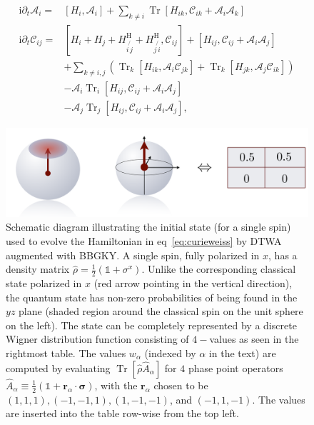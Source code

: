 \documentclass[extendedabs]{bmvc2k}
\newcommand\ii{{\mathrm{i}}}
\DeclareMathOperator{\Tr}{{Tr}}
\newcommand{\Com}[2]{\left[{#1},{#2}\right]}
\begin{document}
\begin{subequations}
\begin{align}
\ii\partial_t \mathscr{A}_i=&\Com{H_i}{\mathscr{A}_i}+\sum_{k\neq i}\Tr\Com{H_{ik}}{\mathscr{C}_{ik}+\mathscr{A}_i \mathscr{A}_k}\label{e:1st_order}\\
\ii\partial_t \mathscr{C}_{ij}=&\Com{H_i+H_j+H_{i\not{\,j}}^\text{H}+H_{j\not{\,i}}^\text{H}}{\mathscr{C}_{ij}}+\Com{H_{ij}}{\mathscr{C}_{ij}+\mathscr{A}_i \mathscr{A}_j}\nonumber\\
&+\sum_{k\neq i,j}\left(\Tr_k\Com{H_{ik}}{\mathscr{A}_i \mathscr{C}_{jk}}+\Tr_k\Com{H_{jk}}{\mathscr{A}_j \mathscr{C}_{ik}}\right)\nonumber\\
&-\mathscr{A}_i\Tr_i\Com{H_{ij}}{\mathscr{C}_{ij}+\mathscr{A}_i \mathscr{A}_j}\nonumber\\
&-\mathscr{A}_j\Tr_j\Com{H_{ij}}{\mathscr{C}_{ij}+\mathscr{A}_i \mathscr{A}_j},\label{e:2nd_order}
\end{align}
\end{subequations}
\begin{figure}[bht!]\centering
\includegraphics[width=\linewidth]{./images/fig1.jpg}
\caption{\label{f:wigner:init}Schematic diagram illustrating the initial state (for a single spin) used to evolve the Hamiltonian in eq~\ref{eq:curieweiss} by DTWA augmented with BBGKY. A single spin, fully polarized in $x$, has a density matrix $\hat{\rho} = \frac{1}{2}(\mathbb{1}+\sigma^x)$. Unlike the corresponding classical state polarized in $x$ (red arrow pointing in the vertical direction), the quantum state has non-zero probabilities of being found in the $yz$ plane (shaded region around the classical spin on the unit sphere on the left). The state can be completely represented by a discrete Wigner distribution function consisting of $4-$values as seen in the rightmost table. The values $w_\alpha$ (indexed by $\alpha$ in the text) are computed by evaluating $\Tr{[\hat{\rho}\hat{A}_\alpha]}$ for $4$ phase point operators $\hat{A}_\alpha\equiv \frac{1}{2}(\mathbb{1}+\bm{r}_\alpha\cdot\bm{\sigma})$, with the $\bm{r}_\alpha$ chosen to be $ (1, 1, 1), (-1, -1, 1),
(1, -1, -1)$, and $(-1, 1, -1)$. The values are inserted into the table row-wise from the top left.}
\end{figure}
\end{document}
